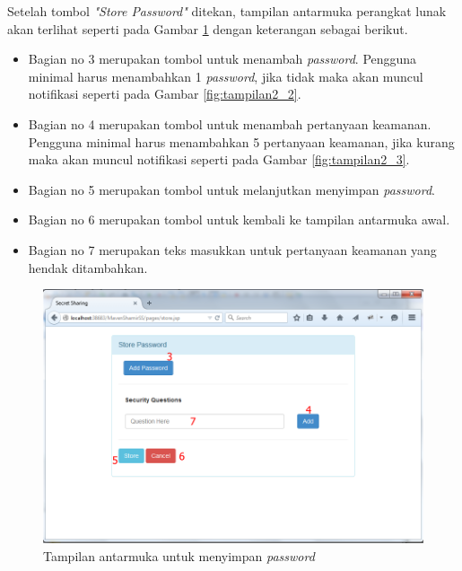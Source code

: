 Setelah tombol \textit{"Store Password"} ditekan, tampilan antarmuka perangkat lunak akan terlihat seperti pada Gambar \ref{fig:tampilan2} dengan keterangan sebagai berikut.

\begin{itemize}
	\item Bagian no 3 merupakan tombol untuk menambah \textit{password}. Pengguna minimal harus menambahkan 1 \textit{password}, jika tidak maka akan muncul notifikasi seperti pada Gambar \ref{fig:tampilan2_2}.
	\item Bagian no 4 merupakan tombol untuk menambah pertanyaan keamanan. Pengguna minimal harus menambahkan 5 pertanyaan keamanan, jika kurang maka akan muncul notifikasi seperti pada Gambar \ref{fig:tampilan2_3}.
	\item Bagian no 5 merupakan tombol untuk melanjutkan menyimpan \textit{password}.
	\item Bagian no 6 merupakan tombol untuk kembali ke tampilan antarmuka awal.
	\item Bagian no 7 merupakan teks masukkan untuk pertanyaan keamanan yang hendak ditambahkan.
\end{itemize}

\begin{figure}[H]
	\includegraphics[scale=0.5]{Gambar/tampilan2}
	\centering
	\caption{Tampilan antarmuka untuk menyimpan \textit{password}}\label{fig:tampilan2}
\end{figure}

